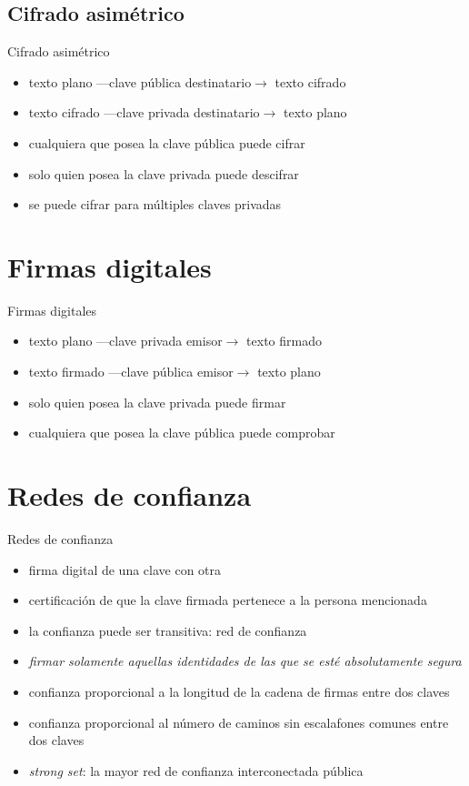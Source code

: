 \documentclass{beamer}
\begin{document}
\subsection{Cifrado asimétrico}
\begin{frame}{Cifrado asimétrico}
\begin{itemize}
    \item texto plano {\tiny ---clave pública destinatario$\rightarrow$} texto
        cifrado
    \item texto cifrado {\tiny ---clave privada destinatario$\rightarrow$} texto
        plano
    \item cualquiera que posea la clave pública puede cifrar
    \item solo quien posea la clave privada puede descifrar
    \item se puede cifrar para múltiples claves privadas
\end{itemize}
\end{frame}


\section{Firmas digitales}
\begin{frame}{Firmas digitales}
\begin{itemize}
    \item texto plano {\tiny ---clave privada emisor$\rightarrow$} texto firmado
    \item texto firmado {\tiny ---clave pública emisor$\rightarrow$} texto plano
    \item solo quien posea la clave privada puede firmar
    \item cualquiera que posea la clave pública puede comprobar
\end{itemize}
\end{frame}


\section{Redes de confianza}
\begin{frame}{Redes de confianza}
\begin{itemize}
    \item firma digital de una clave con otra
    \item certificación de que la clave firmada pertenece a la persona
        mencionada
    \item la confianza puede ser transitiva: red de confianza
    \item \emph{firmar solamente aquellas identidades de las que se esté
        absolutamente segura}
    \item confianza proporcional a la longitud de la cadena de firmas entre dos
        claves
    \item confianza proporcional al número de caminos sin escalafones comunes
        entre dos claves
    \item \emph{strong set}: la mayor red de confianza interconectada pública
\end{itemize}
\end{frame}
\end{document}
